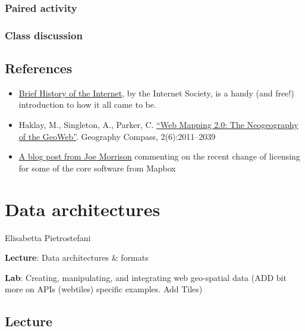 \documentclass[
  letterpaper,
  DIV=11,
  numbers=noendperiod]{scrreprt}
\providecommand{\tightlist}{%
  \setlength{\itemsep}{0pt}\setlength{\parskip}{0pt}}\usepackage{longtable,booktabs,array}
\begin{document}
\hypertarget{paired-activity-1}{%
\subsection{Paired activity}\label{paired-activity-1}}

\hypertarget{class-discussion-1}{%
\subsection{Class discussion}\label{class-discussion-1}}

\hypertarget{references-1}{%
\section{References}\label{references-1}}

\begin{itemize}
\tightlist
\item
  \href{https://www.internetsociety.org/resources/doc/2017/brief-history-internet/}{Brief
  History of the Internet}, by the Internet Society, is a handy (and
  free!) introduction to how it all came to be.
\item
  Haklay, M., Singleton, A., Parker, C.
  \href{https://compass.onlinelibrary.wiley.com/doi/abs/10.1111/j.1749-8198.2008.00167.x}{``Web
  Mapping 2.0: The Neogeography of the GeoWeb''}. Geography Compass,
  2(6):2011--2039
\item
  \href{https://joemorrison.medium.com/death-of-an-open-source-business-model-62bc227a7e9b}{A
  blog post from Joe Morrison} commenting on the recent change of
  licensing for some of the core software from Mapbox
\end{itemize}


\hypertarget{data-architectures}{%
\chapter{Data architectures}\label{data-architectures}}

Elisabetta Pietrostefani

\textbf{Lecture}: Data architectures \& formats

\textbf{Lab}: Creating, manipulating, and integrating web geo-spatial
data (ADD bit more on APIs (webtiles) specific examples. Add Tiles)

\hypertarget{lecture-2}{%
\section{Lecture}\label{lecture-2}}
\end{document}
